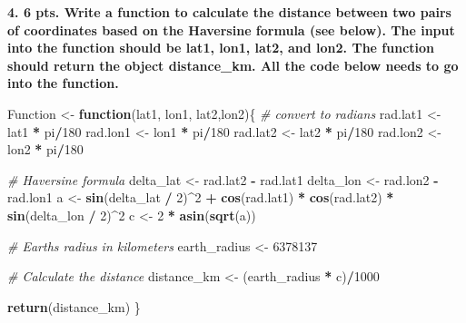 \documentclass[
]{article}
\newenvironment{Shaded}{\begin{snugshade}}{\end{snugshade}}
\newcommand{\CommentTok}[1]{\textcolor[rgb]{0.56,0.35,0.01}{\textit{#1}}}
\newcommand{\ControlFlowTok}[1]{\textcolor[rgb]{0.13,0.29,0.53}{\textbf{#1}}}
\newcommand{\DecValTok}[1]{\textcolor[rgb]{0.00,0.00,0.81}{#1}}
\newcommand{\FunctionTok}[1]{\textcolor[rgb]{0.13,0.29,0.53}{\textbf{#1}}}
\newcommand{\NormalTok}[1]{#1}
\newcommand{\OtherTok}[1]{\textcolor[rgb]{0.56,0.35,0.01}{#1}}
\newcommand{\SpecialCharTok}[1]{\textcolor[rgb]{0.81,0.36,0.00}{\textbf{#1}}}
\begin{document}
\textbf{4. 6 pts. Write a function to calculate the distance between two
pairs of coordinates based on the Haversine formula (see below). The
input into the function should be lat1, lon1, lat2, and lon2. The
function should return the object distance\_km. All the code below needs
to go into the function.}

\begin{Shaded}
\begin{Highlighting}[]
\NormalTok{Function }\OtherTok{\textless{}{-}} \ControlFlowTok{function}\NormalTok{(lat1, lon1, lat2,lon2)\{}
\CommentTok{\# convert to radians}
\NormalTok{rad.lat1 }\OtherTok{\textless{}{-}}\NormalTok{ lat1 }\SpecialCharTok{*}\NormalTok{ pi}\SpecialCharTok{/}\DecValTok{180}
\NormalTok{rad.lon1 }\OtherTok{\textless{}{-}}\NormalTok{ lon1 }\SpecialCharTok{*}\NormalTok{ pi}\SpecialCharTok{/}\DecValTok{180}
\NormalTok{rad.lat2 }\OtherTok{\textless{}{-}}\NormalTok{ lat2 }\SpecialCharTok{*}\NormalTok{ pi}\SpecialCharTok{/}\DecValTok{180}
\NormalTok{rad.lon2 }\OtherTok{\textless{}{-}}\NormalTok{ lon2 }\SpecialCharTok{*}\NormalTok{ pi}\SpecialCharTok{/}\DecValTok{180}

\CommentTok{\# Haversine formula}
\NormalTok{delta\_lat }\OtherTok{\textless{}{-}}\NormalTok{ rad.lat2 }\SpecialCharTok{{-}}\NormalTok{ rad.lat1}
\NormalTok{delta\_lon }\OtherTok{\textless{}{-}}\NormalTok{ rad.lon2 }\SpecialCharTok{{-}}\NormalTok{ rad.lon1}
\NormalTok{a }\OtherTok{\textless{}{-}} \FunctionTok{sin}\NormalTok{(delta\_lat }\SpecialCharTok{/} \DecValTok{2}\NormalTok{)}\SpecialCharTok{\^{}}\DecValTok{2} \SpecialCharTok{+} \FunctionTok{cos}\NormalTok{(rad.lat1) }\SpecialCharTok{*} \FunctionTok{cos}\NormalTok{(rad.lat2) }\SpecialCharTok{*} \FunctionTok{sin}\NormalTok{(delta\_lon }\SpecialCharTok{/} \DecValTok{2}\NormalTok{)}\SpecialCharTok{\^{}}\DecValTok{2}
\NormalTok{c }\OtherTok{\textless{}{-}} \DecValTok{2} \SpecialCharTok{*} \FunctionTok{asin}\NormalTok{(}\FunctionTok{sqrt}\NormalTok{(a)) }

\CommentTok{\# Earth\textquotesingle{}s radius in kilometers}
\NormalTok{earth\_radius }\OtherTok{\textless{}{-}} \DecValTok{6378137}

\CommentTok{\# Calculate the distance}
\NormalTok{distance\_km }\OtherTok{\textless{}{-}}\NormalTok{ (earth\_radius }\SpecialCharTok{*}\NormalTok{ c)}\SpecialCharTok{/}\DecValTok{1000}

\FunctionTok{return}\NormalTok{(distance\_km) \}}
\end{Highlighting}
\end{Shaded}
\end{document}

